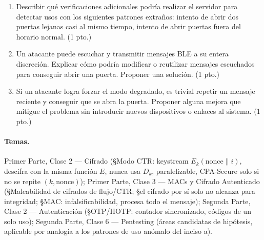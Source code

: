 \begin{consigna}
\begin{enumerate}
  \item[a)] Describir qué verificaciones adicionales podría realizar el servidor
  para detectar usos con los siguientes patrones extraños: intento de abrir dos
  puertas lejanas casi al mismo tiempo, intento de abrir puertas fuera del horario
  normal. (1 pto.)
  \item[b)] Un atacante puede escuchar y transmitir mensajes BLE a su entera
  discreción. Explicar cómo podría modificar o reutilizar mensajes escuchados para
  conseguir abrir una puerta. Proponer una solución. (1 pto.)
  \item[c)] Si un atacante logra forzar el modo degradado, es trivial repetir un
  mensaje reciente y conseguir que se abra la puerta. Proponer alguna mejora que
  mitigue el problema sin introducir nuevos dispositivos o enlaces al sistema.
  (1 pto.)
\end{enumerate}
\end{consigna}

\paragraph{Temas.}
Primer Parte, Clase 2 --- Cifrado (\S Modo CTR: keystream $E_k(\text{nonce}\|i)$,
descifra con la misma función $E$, nunca usa $D_k$, paralelizable, CPA-Secure solo
si no se repite $(k,\text{nonce})$); Primer Parte, Clase 3 --- MACs y Cifrado
Autenticado (\S Maleabilidad de cifrados de flujo/CTR; \S el cifrado por sí solo no
alcanza para integridad; \S MAC: infalsificabilidad, procesa todo el mensaje);
Segunda Parte, Clase 2 --- Autenticación (\S OTP/HOTP: contador sincronizado,
códigos de un solo uso); Segunda Parte, Clase 6 --- Pentesting (áreas candidatas de
hipótesis, aplicable por analogía a los patrones de uso anómalo del inciso a).

